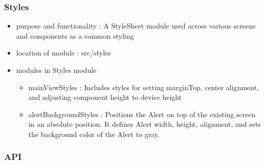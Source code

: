 \documentclass[conference]{IEEEtran}
\begin{document}
\subsubsection{Styles}

\begin{itemize}
    \item purpose and functionality : A StyleSheet module used across various screens and components as a common styling
    \item location of module : src/styles
    \item modules in Styles module
    \begin{itemize}
        \item mainViewStyles : Includes styles for setting marginTop, center alignment, and adjusting component height to device height
        \item alertBackgroundStyles : Positions the Alert on top of the existing screen in an absolute position. It defines Alert width, height, alignment, and sets the background color of the Alert to gray.
        \vspace{0.5cm}
    \end{itemize}
\end{itemize}

\subsubsection{API}
\end{document}
